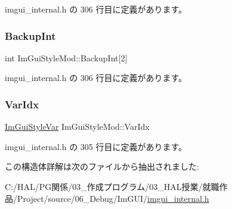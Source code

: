  imgui\+\_\+internal.\+h の 306 行目に定義があります。

\mbox{\label{struct_im_gui_style_mod_a60491c95989b2a866ebb76403a562f6f}} 
\subsubsection{\texorpdfstring{Backup\+Int}{BackupInt}}
{\footnotesize\ttfamily int Im\+Gui\+Style\+Mod\+::\+Backup\+Int\mbox{[}2\mbox{]}}



 imgui\+\_\+internal.\+h の 306 行目に定義があります。

\mbox{\label{struct_im_gui_style_mod_ab23c55941dbd0e156ce640a8fecb2feb}} 
\subsubsection{\texorpdfstring{Var\+Idx}{VarIdx}}
{\footnotesize\ttfamily \mbox{\hyperlink{imgui_8h_ac919acabce24faae590e295b424874ca}{Im\+Gui\+Style\+Var}} Im\+Gui\+Style\+Mod\+::\+Var\+Idx}



 imgui\+\_\+internal.\+h の 305 行目に定義があります。



この構造体詳解は次のファイルから抽出されました\+:\begin{DoxyCompactItemize}
\item 
C\+:/\+H\+A\+L/\+P\+G関係/03\+\_\+作成プログラム/03\+\_\+\+H\+A\+L授業/就職作品/\+Project/source/06\+\_\+\+Debug/\+Im\+G\+U\+I/\mbox{\hyperlink{imgui__internal_8h}{imgui\+\_\+internal.\+h}}\end{DoxyCompactItemize}
